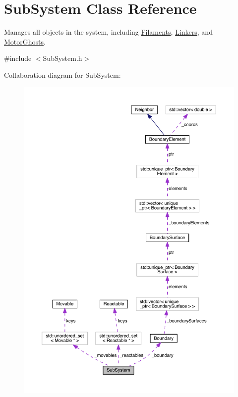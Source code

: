 \hypertarget{classSubSystem}{\section{Sub\+System Class Reference}
\label{classSubSystem}
}


Manages all objects in the system, including \hyperlink{classFilament}{Filaments}, \hyperlink{classLinker}{Linkers}, and \hyperlink{classMotorGhost}{Motor\+Ghosts}.  




{\ttfamily \#include $<$Sub\+System.\+h$>$}



Collaboration diagram for Sub\+System\+:
\nopagebreak
\begin{figure}[H]
\begin{center}
\leavevmode
\includegraphics[width=350pt]{classSubSystem__coll__graph}
\end{center}
\end{figure}
